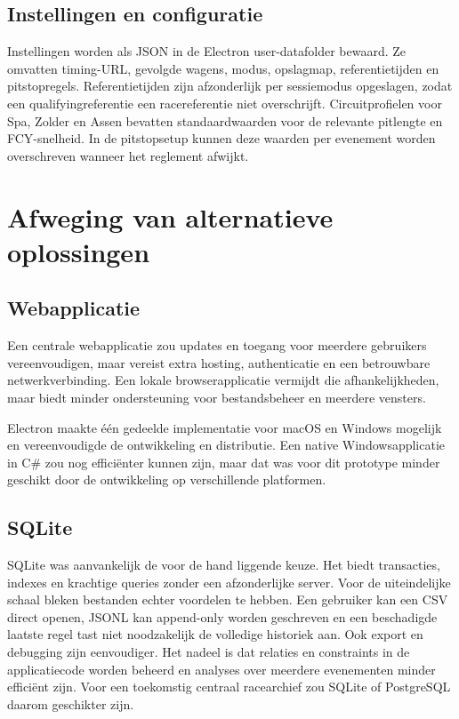 
\fi

\subsection{Instellingen en configuratie}
Instellingen worden als JSON in de Electron user-datafolder bewaard. Ze omvatten timing-URL,
gevolgde wagens, modus, opslagmap, referentietijden en pitstopregels. Referentietijden zijn
afzonderlijk per sessiemodus opgeslagen, zodat een qualifyingreferentie een racereferentie niet
overschrijft. Circuitprofielen voor Spa, Zolder en Assen bevatten standaardwaarden voor de relevante
pitlengte en FCY-snelheid. In de pitstopsetup kunnen deze waarden per evenement worden overschreven
wanneer het reglement afwijkt.

\section{Afweging van alternatieve oplossingen}
\label{chap:alternatieven}

\subsection{Webapplicatie}
Een centrale webapplicatie zou updates en toegang voor meerdere gebruikers vereenvoudigen, maar vereist extra hosting, authenticatie en een betrouwbare netwerkverbinding. Een lokale browserapplicatie vermijdt die afhankelijkheden, maar biedt minder ondersteuning voor bestandsbeheer en meerdere vensters.

Electron maakte één gedeelde implementatie voor macOS en Windows mogelijk en vereenvoudigde de ontwikkeling en distributie. Een native Windowsapplicatie in C\# zou nog efficiënter kunnen zijn, maar dat was voor dit prototype minder geschikt door de ontwikkeling op verschillende platformen.

\subsection{SQLite}
SQLite was aanvankelijk de voor de hand liggende keuze. Het biedt transacties, indexes en krachtige
queries zonder een afzonderlijke server. Voor de uiteindelijke schaal bleken bestanden echter voordelen
te hebben. Een gebruiker kan een CSV direct openen, JSONL kan append-only worden geschreven en een
beschadigde laatste regel tast niet noodzakelijk de volledige historiek aan. Ook export en debugging
zijn eenvoudiger.
Het nadeel is dat relaties en constraints in de applicatiecode worden beheerd en analyses over meerdere evenementen minder efficiënt zijn. Voor een toekomstig centraal racearchief zou SQLite of PostgreSQL daarom geschikter zijn.

